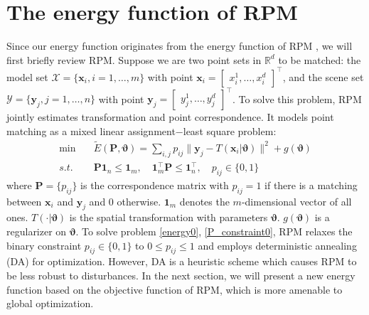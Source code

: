 \documentclass[11pt,bezier,]{article}
\begin{document}
\section{
The energy function of RPM 
\label{sect:RPM_objective}}
Since our energy function originates from the energy function of RPM \cite{RPM_TPS}, 
we will first briefly review RPM. %
Suppose  we are two point sets in $\mathbb R^d$ to be matched: 
the model  set 
$\mathscr{X}=\{ \mathbf x_i,i=1,\ldots,m\}$ with  point 
$ \mathbf x_i=\begin{bmatrix}x_i^1,\ldots,x_i^d\end{bmatrix}^\top$,
and the scene set 
$\mathscr{Y}=\{ \mathbf y_j,j=1,\ldots,n\}$ with  point 
$ \mathbf y_j=\begin{bmatrix}y_j^1,\ldots,y_j^d \end{bmatrix}^\top$. 
To solve this problem, 
RPM jointly estimates  transformation and  point correspondence. 
It models point matching as a mixed linear assignment$-$least square problem:
\begin{subequations}
\begin{align} 
\min \quad & \widetilde E (\mathbf P,{\boldsymbol\vartheta})= 
\sum_{i,j}p_{ij}\| \mathbf y_j-T( \mathbf x_i| {\boldsymbol\vartheta})\|^2  
+ g({\boldsymbol\vartheta})  \label{energy0}  \\ 
s.t.\quad &
\mathbf P \mathbf 1_n\le  \mathbf 1_m, \quad \mathbf 1_m^\top \mathbf P\le \mathbf 1_n^\top,   
\quad  p_{ij}\in\{0,1\} \label{P_constraint0}
\end{align}       
\end{subequations}
where  $\mathbf P=\{p_{ij}\}$ is the correspondence matrix
with  $p_{ij}=1$ if there is a matching between $\mathbf x_i$ and $\mathbf y_j$ and $0$ otherwise.
$\mathbf 1_m$ denotes the $m$-dimensional  vector of  all ones.
$T(\cdot|\boldsymbol\vartheta)$ is the spatial transformation 
with  parameters ${\boldsymbol\vartheta}$.
$g({\boldsymbol\vartheta})$ is a regularizer  on ${\boldsymbol\vartheta}$. 
To solve problem \eqref{energy0},  \eqref{P_constraint0},
RPM relaxes  the binary constraint $p_{ij}\in\{0,1\}$ %
to $0\le p_{ij}\le 1$ 
and 
employs deterministic annealing (DA) for optimization. 
However, 
DA is a heuristic scheme which causes RPM to be less robust to disturbances. 
In the next section, 
we will present a new energy function based on the objective function of  RPM, 
which is more amenable to global optimization.
\end{document}
